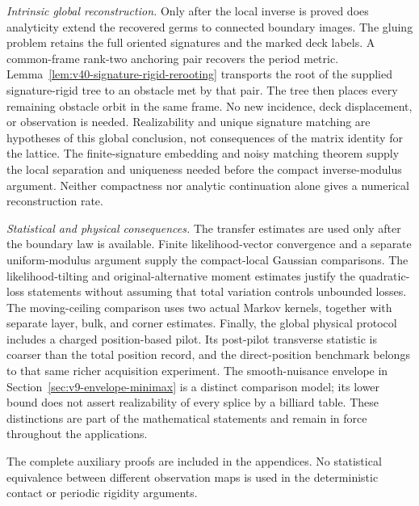 \emph{Intrinsic global reconstruction.}
Only after the local inverse is proved does analyticity extend the
recovered germs to connected boundary images.  The gluing problem
retains the full oriented signatures and the marked deck labels.
A common-frame rank-two anchoring pair recovers the period metric.
Lemma~\ref{lem:v40-signature-rigid-rerooting} transports the root of the
supplied signature-rigid tree to an obstacle met by that pair.  The tree
then places every remaining obstacle orbit in the same frame.  No new
incidence, deck displacement, or observation is needed.  Realizability and unique signature matching are
hypotheses of this global conclusion, not consequences of the matrix
identity for the lattice.  The finite-signature embedding and noisy
matching theorem supply the local separation and uniqueness needed
before the compact inverse-modulus argument.  Neither compactness nor
analytic continuation alone gives a numerical reconstruction rate.

\emph{Statistical and physical consequences.}
The transfer estimates are used only after the boundary law is available.
Finite likelihood-vector convergence and a separate uniform-modulus
argument supply the compact-local Gaussian comparisons.  The
likelihood-tilting and original-alternative moment estimates justify the
quadratic-loss statements without assuming that total variation controls
unbounded losses.  The moving-ceiling comparison uses two actual Markov
kernels, together with separate layer, bulk, and corner estimates.
Finally, the global physical protocol includes a charged position-based
pilot.  Its post-pilot transverse statistic is coarser than the total
position record, and the direct-position benchmark belongs to that same
richer acquisition experiment.  The smooth-nuisance envelope in
Section~\ref{sec:v9-envelope-minimax} is a distinct comparison model;
its lower bound does not assert realizability of every splice by a
billiard table.  These distinctions are part of the mathematical
statements and remain in force throughout the applications.

The complete auxiliary proofs are included in the appendices.  No
statistical equivalence between different observation maps is used in
the deterministic contact or periodic rigidity arguments.
